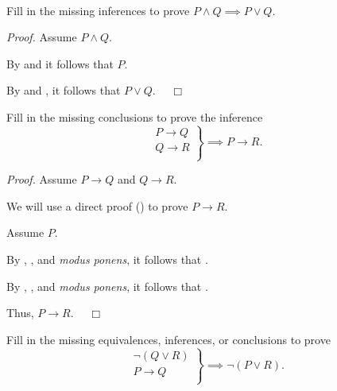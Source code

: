 \begin{act}
\label{act_proofs_equiv_infer}
~
    \begin{actpart}  
        \item Fill in the missing inferences to prove $P \land Q \implies P \lor Q$.

            \emph{Proof.}
            Assume  $P \land Q$.  
        
            By  and \underline{\hspace{.75 in}} it follows that  $P$.  
        
            By  and \underline{\hspace{.75 in}}, it follows that $P \lor Q$.~ \hfill ~$\Box$ 
    
        \item Fill in the missing conclusions to prove the  inference     
            $$\left. \begin{array} {cc}
            P \to Q \\
            Q \to R \\ 
            \end{array} \right\} \implies P \to R.$$

            \emph{Proof.} Assume  $P \to Q$ and  $Q \to R$.
        
            We will use a direct proof () to prove $P \to R$.  
        
            Assume  $P$. 

            By , , and \emph{modus ponens}, it follows that  \underline{\hspace{.75 in}}.

            By , , and \emph{modus ponens}, it follows that \underline{\hspace{.75 in}}.

            Thus, $P \to R$.~ \hfill ~$\Box$ 

        \item \label{part_proof_equiv_infer_another} Fill in the missing equivalences, inferences, or conclusions to prove 
            $$\left. \begin{array} {cc}
            \neg(Q \lor R) \\
            P \to Q \\
            \end{array} \right\} \implies \neg (P \lor R).$$


\end{actpart}
\end{act}
